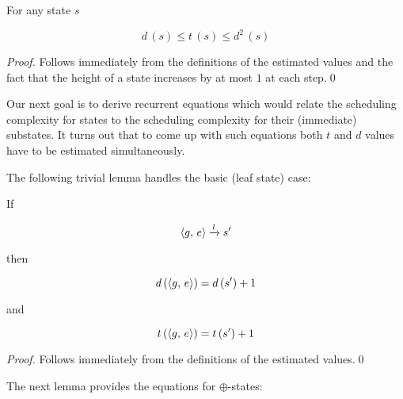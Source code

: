 \begin{lemma}
  For any state $s$

  \[
  d\,(s) \le t\,(s) \le d^2\,(s)
  \]
  
\end{lemma}
\begin{proof}
  Follows immediately from the definitions of the estimated values and the fact that the height of a state increases by at most $1$ at each step.\qed
\end{proof}

Our next goal is to derive recurrent equations which would relate the scheduling complexity for states to the scheduling complexity for their
(immediate) substates. It turns out that to come up with such equations both $t$ and $d$ values have to be estimated simultaneously.  



The following trivial lemma handles the basic (leaf state) case:

\begin{lemma}
  If

  \[\langle g ,\, e \rangle \xrightarrow{l} s^\prime\]

  then

  \[d\,(\langle g ,\, e \rangle) = d\,(s^\prime) + 1\]

  and

  \[t\,(\langle g ,\, e \rangle) = t\,(s^\prime) + 1\]
\end{lemma}
\begin{proof}
    Follows immediately from the definitions of the estimated values.\qed
\end{proof}


The next lemma provides the equations for $\oplus$-states:

